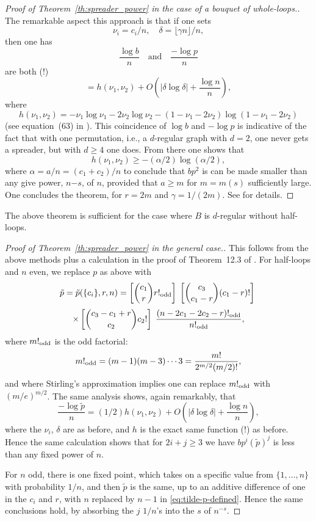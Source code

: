 \documentclass{memo-l}
\newcommand{\oddf}{!_{\rm odd}}
\theoremstyle{plain}
\theoremstyle{definition}
\numberwithin{section}{chapter}
\numberwithin{equation}{chapter}
\theoremstyle{plain}
\theoremstyle{definition}
\begin{document}
\begin{proof}[Proof of Theorem~\ref{th:spreader_power} in the case of
a bouquet of whole-loops.]
The remarkable aspect this approach is that if 
one sets
$$
\nu_i = c_i/n, \quad
\delta = \lfloor \gamma n \rfloor /n,
$$
then one has
$$
\frac{\log b}{n} \quad\mbox{and}\quad 
\frac{-\log p}{n} 
$$
are both (!)
$$
= h(\nu_1,\nu_2)+
O\left(|\delta\log\delta|+\frac{\log n}{n}\right) ,
$$
where
$$
h(\nu_1,\nu_2) = -\nu_1\log\nu_1-2\nu_2\log\nu_2
-(1-\nu_1-2\nu_2)
\log(1-\nu_1-2\nu_2)
$$
(see equation~(63) in \cite{friedman_alon}).
This coincidence of $\log b$ and $-\log p$ is indicative of the
fact that with one permutation, i.e., a $d$-regular graph with $d=2$,
one never gets a spreader, but with $d\ge 4$ one does.
From there one shows that
$$
h(\nu_1,\nu_2) \ge -(\alpha/2)\log(\alpha/2),
$$
where $\alpha=a/n=(c_1+c_2)/n$ to conclude that
$bp^2$ is can be made smaller than any give power, $n{-s}$, of $n$, 
provided
that $a\ge m$ for $m=m(s)$ sufficiently large.
One concludes the theorem, for $r=2m$ and $\gamma=1/(2m)$.
See \cite{friedman_alon} for details.
\end{proof}

The above theorem is sufficient for the case where $B$ is $d$-regular
without half-loops.  

\begin{proof}[Proof of Theorem~\ref{th:spreader_power} in the general
case.]
This follows from the above methods plus a calculation in
the proof of Theorem~12.3 of \cite{friedman_alon}.
For half-loops and $n$ even, we replace $p$ as above with
\begin{equation}\label{eq:tilde-p-defined}
\tilde p=\tilde p(\{c_i\},r,n)=
\left[ \binom{c_1}{r} r\oddf \right]\;
\left[ \binom{c_3}{c_1-r} (c_1-r)! \right]\;
\end{equation}
$$
\times
\left[ \binom{c_3-c_1+r}{c_2} c_2! \right]\;
\frac{ (n-2c_1-2c_2-r)\oddf }{n\oddf},
$$
where $m\oddf$ is the odd factorial:
\begin{equation}\label{eq:odd_factorial}
m\oddf = (m-1)(m-3)\cdots 3 = \frac{m!}{2^{m/2}(m/2)!},
\end{equation}
and where Stirling's approximation implies one can replace $m\oddf$ with 
$(m/e)^{m/2}$.  The same analysis shows, again remarkably, that
$$
\frac{-\log \tilde p}{n} = (1/2) h(\nu_1,\nu_2)+
O\left(|\delta\log\delta|+\frac{\log n}{n}\right) ,
$$
where the $\nu_i$, $\delta$ are as before,
and $h$ is the exact same function (!) as before.
Hence the same calculation shows that for $2i+j\ge 3$ we have
$bp^i(\tilde p)^j$
is less than any fixed power of $n$.

For $n$ odd, there is one fixed point, which takes on a specific
value from $\{1,\ldots,n\}$ with probability $1/n$, and then
$\tilde p$ is the same, up to an additive difference of one in the $c_i$
and $r$, with $n$ replaced by $n-1$ in \eqref{eq:tilde-p-defined}.
Hence the same conclusions hold, by absorbing the $j$ $1/n$'s into the 
$s$ of $n^{-s}$.
\end{proof}
\end{document}
